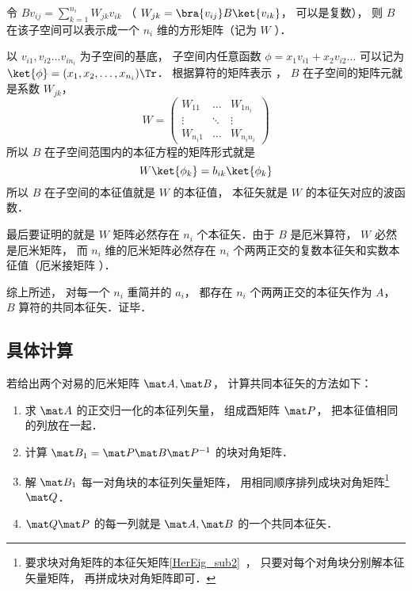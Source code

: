 令 $B v_{ij} = \sum_{k=1}^{n_i} W_{jk}v_{ik}$ （ $W_{jk} = \bra{v_{ij}} B \ket{v_{ik}}$， 可以是复数）， 则 $B$ 在该子空间可以表示成一个 $n_i$ 维的方形矩阵（记为 $W$ ）．

以 $v_{i1}, v_{i2} \dots v_{i n_i}$ 为子空间的基底， 子空间内任意函数 $\phi  = x_1 v_{i1} + x_2 v_{i2}\dots$ 可以记为 $\ket{\phi} = (x_1, x_2, \dots, x_{n_i})\Tr$． 根据算符的矩阵表示
， $B$ 在子空间的矩阵元就是系数 $W_{jk}$， 
\begin{equation}
W = \begin{pmatrix}
W_{11} & \ldots & W_{1 n_i}\\
\vdots & \ddots & \vdots \\
W_{n_i 1} & \ldots & W_{n_i n_i}
\end{pmatrix}
\end{equation}
所以 $B$ 在子空间范围内的本征方程的矩阵形式就是
\begin{equation}
W \ket{\phi_k} = b_{ik} \ket{\phi_k}
\end{equation}
所以 $B$ 在子空间的本征值就是 $W$ 的本征值， 本征矢就是 $W$ 的本征矢对应的波函数．

最后要证明的就是 $W$ 矩阵必然存在 $n_i$ 个本征矢．由于 $B$ 是厄米算符，  $W$ 必然是厄米矩阵， 而 $n_i$ 维的厄米矩阵必然存在 $n_i$ 个两两正交的复数本征矢和实数本征值（厄米接矩阵%
）．

综上所述， 对每一个 $n_i$ 重简并的 $a_i$，  都存在 $n_i$ 个两两正交的本征矢作为 $A$，  $B$ 算符的共同本征矢．证毕．

\subsection{具体计算}
若给出两个对易的厄米矩阵 $\mat A, \mat B$， 计算共同本征矢的方法如下：
\begin{enumerate}
\item 求 $\mat A$ 的正交归一化的本征列矢量， 组成酉矩阵 $\mat P$， 把本征值相同的列放在一起．
\item 计算 $\mat B_1 = \mat P \mat B\mat P^{-1}$ 的块对角矩阵．
\item 解 $\mat B_1$ 每一对角块的本征列矢量矩阵， 用相同顺序排列成块对角矩阵\footnote{要求块对角矩阵的本征矢矩阵\autoref{HerEig_sub2}~， 只要对每个对角块分别解本征矢量矩阵， 再拼成块对角矩阵即可．} $\mat Q$．
\item $\mat Q\mat P$ 的每一列就是 $\mat A, \mat B$ 的一个共同本征矢．
\end{enumerate}

